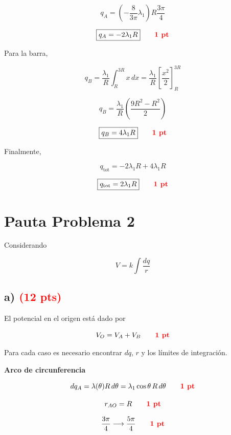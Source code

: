 \documentclass[12pt]{article}
\begin{document}
\[
q_A
=
\left(
-\frac{8}{3\pi}\lambda_1
\right)
R\frac{3\pi}{4}
\]

\[
\boxed{
q_A=-2\lambda_1R
}
\qquad
\textcolor{red}{\textbf{1 pt}}
\]

Para la barra,

\[
q_B
=
\frac{\lambda_1}{R}
\int_R^{3R}x\,dx
=
\frac{\lambda_1}{R}
\left[
\frac{x^2}{2}
\right]_R^{3R}
\]

\[
q_B
=
\frac{\lambda_1}{R}
\left(
\frac{9R^2-R^2}{2}
\right)
\]

\[
\boxed{
q_B=4\lambda_1R
}
\qquad
\textcolor{red}{\textbf{1 pt}}
\]

Finalmente,

\[
q_{\text{tot}}
=
-2\lambda_1R+4\lambda_1R
\]

\[
\boxed{
q_{\text{tot}}
=
2\lambda_1R
}
\qquad
\textcolor{red}{\textbf{1 pt}}
\]

\newpage


\section*{Pauta Problema 2}

Considerando

\[
V=k\int\frac{dq}{r}
\]

\subsection*{a) \hfill \textcolor{red}{\textbf{(12 pts)}}}

El potencial en el origen está dado por

\[
V_O=V_A+V_B
\qquad
\textcolor{red}{\textbf{1 pt}}
\]

Para cada caso es necesario encontrar $dq$, $r$ y los límites de integración.

\vspace{0.3cm}

\textbf{Arco de circunferencia}

\[
dq_A
=
\lambda(\theta)R\,d\theta
=
\lambda_1\cos\theta\,R\,d\theta
\qquad
\textcolor{red}{\textbf{1 pt}}
\]

\[
r_{AO}=R
\qquad
\textcolor{red}{\textbf{1 pt}}
\]

\[
\frac{3\pi}{4}
\longrightarrow
\frac{5\pi}{4}
\qquad
\textcolor{red}{\textbf{1 pt}}
\]

\vspace{0.3cm}
\end{document}
